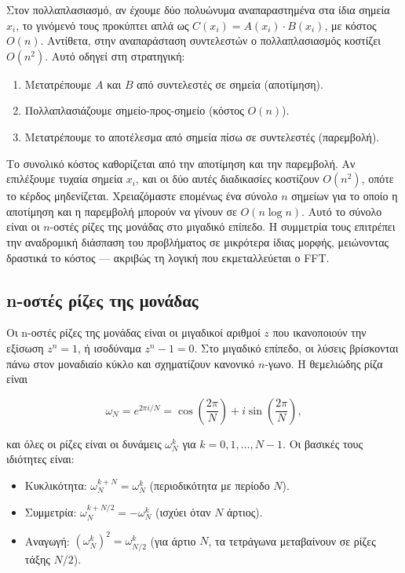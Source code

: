 \documentclass[a4paper, 11pt]{article}
\providecommand{\tightlist}{\setlength{\itemsep}{0pt}\setlength{\parskip}{0pt}}
\begin{document}
Στον πολλαπλασιασμό, αν έχουμε δύο πολυώνυμα αναπαραστημένα στα ίδια
σημεία \(x_i\), το γινόμενό τους προκύπτει απλά ως
\(C(x_i) = A(x_i) \cdot B(x_i)\), με κόστος \(O(n)\). Αντίθετα, στην
αναπαράσταση συντελεστών ο πολλαπλασιασμός κοστίζει \(O(n^2)\). Αυτό
οδηγεί στη στρατηγική:

\begin{enumerate}
\def\labelenumi{\arabic{enumi}.}
\item
  Μετατρέπουμε \(A\) και \(B\) από συντελεστές σε σημεία (αποτίμηση).
\item
  Πολλαπλασιάζουμε σημείο-προς-σημείο (κόστος \(O(n)\)).
\item
  Μετατρέπουμε το αποτέλεσμα από σημεία πίσω σε συντελεστές (παρεμβολή).
\end{enumerate}

Το συνολικό κόστος καθορίζεται από την αποτίμηση και την παρεμβολή. Αν
επιλέξουμε τυχαία σημεία \(x_i\), και οι δύο αυτές διαδικασίες κοστίζουν
\(O(n^2)\), οπότε το κέρδος μηδενίζεται. Χρειαζόμαστε επομένως ένα
σύνολο \(n\) σημείων για το οποίο η αποτίμηση και η παρεμβολή μπορούν να
γίνουν σε \(O(n \log n)\). Αυτό το σύνολο είναι οι \(n\)-οστές ρίζες της
μονάδας στο μιγαδικό επίπεδο. Η συμμετρία τους επιτρέπει την αναδρομική
διάσπαση του προβλήματος σε μικρότερα ίδιας μορφής, μειώνοντας δραστικά
το κόστος --- ακριβώς τη λογική που εκμεταλλεύεται ο FFT.

\subsection{n-οστές ρίζες της
μονάδας}\label{n-ux3bfux3c3ux3c4ux3adux3c2-ux3c1ux3afux3b6ux3b5ux3c2-ux3c4ux3b7ux3c2-ux3bcux3bfux3bdux3acux3b4ux3b1ux3c2}

Οι n-οστές ρίζες της μονάδας είναι οι μιγαδικοί αριθμοί \(z\) που
ικανοποιούν την εξίσωση \(z^n = 1\), ή ισοδύναμα \(z^n - 1 = 0\). Στο
μιγαδικό επίπεδο, οι λύσεις βρίσκονται πάνω στον μοναδιαίο κύκλο και
σχηματίζουν κανονικό \(n\)-γωνο. Η θεμελιώδης ρίζα είναι

\[
\omega_N = e^{2\pi i / N} = \cos\left(\frac{2\pi}{N}\right) + i \sin\left(\frac{2\pi}{N}\right),
\]

και όλες οι ρίζες είναι οι δυνάμεις \(\omega_N^k\) για
\(k = 0,1,\dots,N-1\). Οι βασικές τους ιδιότητες είναι:

\begin{itemize}
\tightlist
\item
  Κυκλικότητα: \(\omega_N^{k+N} = \omega_N^k\) (περιοδικότητα με περίοδο
  \(N\)).
\item
  Συμμετρία: \(\omega_N^{k+N/2} = -\omega_N^k\) (ισχύει όταν \(N\)
  άρτιος).
\item
  Αναγωγή: \((\omega_N^k)^2 = \omega_{N/2}^k\) (για άρτιο \(N\), τα
  τετράγωνα μεταβαίνουν σε ρίζες τάξης \(N/2\)).
\end{itemize}
\end{document}
